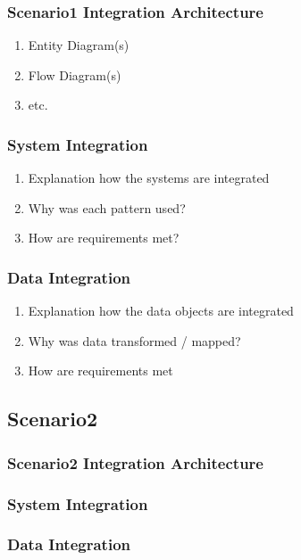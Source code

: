\documentclass[
     12pt,         %
     a4paper,      %
     BCOR10mm,     %
     DIV14,        %
     ]{scrreprt}
\begin{document}
\subsubsection{Scenario1 Integration Architecture}
\begin{enumerate}
     \item Entity Diagram(s)
     \item Flow Diagram(s)
     \item etc.
\end{enumerate}

\subsubsection{System Integration}
\begin{enumerate}
     \item Explanation how the systems are integrated
     \item Why was each pattern used?
     \item How are requirements met?
\end{enumerate}

\subsubsection{Data Integration}
\begin{enumerate}
     \item Explanation how the data objects are integrated
     \item Why was data transformed / mapped?
     \item How are requirements met
\end{enumerate}

\subsection{Scenario2}

\subsubsection{Scenario2 Integration Architecture}

\subsubsection{System Integration}

\subsubsection{Data Integration}
\end{document}
